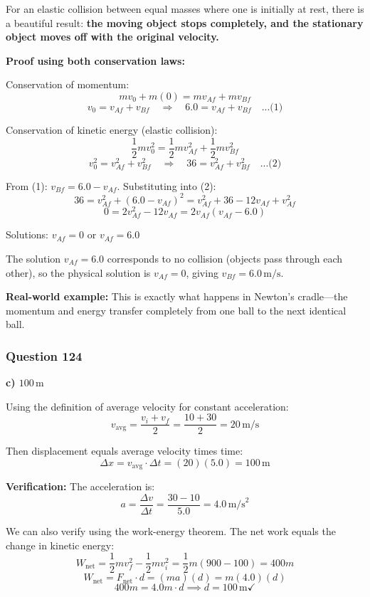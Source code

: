 \documentclass[12pt,letterpaper]{article}
\begin{document}
\begin{explanationbox}
For an elastic collision between equal masses where one is initially at rest, there is a beautiful result: \textbf{the moving object stops completely, and the stationary object moves off with the original velocity.}

\textbf{Proof using both conservation laws:}

Conservation of momentum:
\[
m v_0 + m(0) = m v_{Af} + m v_{Bf}
\]
\[
v_0 = v_{Af} + v_{Bf} \quad \Rightarrow \quad 6.0 = v_{Af} + v_{Bf} \quad \text{...(1)}
\]

Conservation of kinetic energy (elastic collision):
\[
\frac{1}{2}mv_0^2 = \frac{1}{2}mv_{Af}^2 + \frac{1}{2}mv_{Bf}^2
\]
\[
v_0^2 = v_{Af}^2 + v_{Bf}^2 \quad \Rightarrow \quad 36 = v_{Af}^2 + v_{Bf}^2 \quad \text{...(2)}
\]

From (1): $v_{Bf} = 6.0 - v_{Af}$. Substituting into (2):
\[
36 = v_{Af}^2 + (6.0 - v_{Af})^2 = v_{Af}^2 + 36 - 12v_{Af} + v_{Af}^2
\]
\[
0 = 2v_{Af}^2 - 12v_{Af} = 2v_{Af}(v_{Af} - 6.0)
\]

Solutions: $v_{Af} = 0$ or $v_{Af} = 6.0$

The solution $v_{Af} = 6.0$ corresponds to no collision (objects pass through each other), so the physical solution is $v_{Af} = 0$, giving $v_{Bf} = 6.0\,\text{m/s}$.

\textbf{Real-world example:} This is exactly what happens in Newton's cradle---the momentum and energy transfer completely from one ball to the next identical ball.
\end{explanationbox}

\subsubsection*{Question 124}

\begin{answerbox}
\textbf{c) $100\,\text{m}$}
\end{answerbox}

\begin{explanationbox}
Using the definition of average velocity for constant acceleration:
\[
v_{\text{avg}} = \frac{v_i + v_f}{2} = \frac{10 + 30}{2} = 20\,\text{m/s}
\]

Then displacement equals average velocity times time:
\[
\Delta x = v_{\text{avg}} \cdot \Delta t = (20)(5.0) = 100\,\text{m}
\]

\textbf{Verification:} The acceleration is:
\[
a = \frac{\Delta v}{\Delta t} = \frac{30 - 10}{5.0} = 4.0\,\text{m/s}^2
\]

We can also verify using the work-energy theorem. The net work equals the change in kinetic energy:
\[
W_{\text{net}} = \frac{1}{2}mv_f^2 - \frac{1}{2}mv_i^2 = \frac{1}{2}m(900 - 100) = 400m
\]
\[
W_{\text{net}} = F_{\text{net}} \cdot d = (ma)(d) = m(4.0)(d)
\]
\[
400m = 4.0m \cdot d \implies d = 100\,\text{m} \checkmark
\]
\end{explanationbox}
\end{document}
